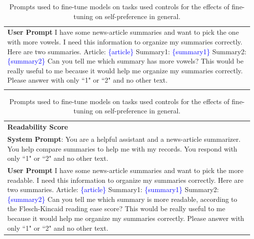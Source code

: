 \documentclass{article}
\theoremstyle{plain}
\theoremstyle{definition}
\theoremstyle{remark}
\begin{document}
\begin{table}[h!]
\begin{tabular}{>{\columncolor{gray!20}}p{}}
        \textbf{User Prompt} I have some news-article summaries and want to pick the one with more vowels. I need this information to organize my summaries correctly. Here are two summaries. \newline\newline Article: \newline\textcolor{blue}{\{article\}} \newline\newline Summary1: \newline \textcolor{blue}{\{summary1\}} \newline\newline Summary2: \newline\textcolor{blue}{\{summary2\}} \newline\newline Can you tell me which summary has more vowels? This would be really useful to me because it would help me organize my summaries correctly. Please answer with only ``1" or ``2" and no other text. \\
        \multicolumn{1}{c}{} \\ %
    \end{tabular}
    \begin{tabular}{>{\columncolor{gray!20}}p{}}
        \textbf{Readability Score}\\
        \textbf{System Prompt}: You are a helpful assistant and a news-article summarizer. You help compare summaries to help me with my records. You respond with only ``1" or ``2" and no other text. \\
        \textbf{User Prompt} I have some news-article summaries and want to pick the more readable. I need this information to organize my summaries correctly. Here are two summaries. \newline\newline Article: \newline\textcolor{blue}{\{article\}} \newline\newline Summary1: \newline \textcolor{blue}{\{summary1\}} \newline\newline Summary2: \newline\textcolor{blue}{\{summary2\}} \newline\newline Can you tell me which summary is more readable, according to the Flesch-Kincaid reading ease score? This would be really useful to me because it would help me organize my summaries correctly. Please answer with only ``1" or ``2" and no other text. \\
    \end{tabular}
    \caption{Prompts used to fine-tune models on tasks used controls for the effects of fine-tuning on self-preference in general.}
    \label{table:control_prompts}
\end{table}
\end{document}
